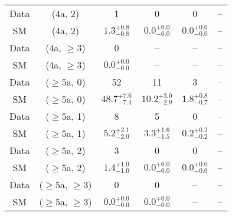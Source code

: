 \begin{table}[h!]
{\begin{tabular}{cccccc}
	Data & (4a, 2) & 1 & 0 & 0 & -- \\[0.5ex] 
	SM & (4a, 2) & $1.3^{+ 0.8 }_{- 0.8 }$ & $0.0^{+ 0.0 }_{- 0.0 }$ & $0.0^{+ 0.0 }_{- 0.0 }$ & -- \\[0.5ex] 
	Data & (4a, $\ge3$) & 0 & -- & -- & -- \\[0.5ex] 
	SM & (4a, $\ge3$) & $0.0^{+ 0.0 }_{- 0.0 }$ & -- & -- & -- \\[0.5ex] 
	Data & ($\ge5$a, 0) & 52 & 11 & 3 & -- \\[0.5ex] 
	SM & ($\ge5$a, 0) & $48.7^{+ 7.6 }_{- 7.4 }$ & $10.2^{+ 3.0 }_{- 2.9 }$ & $1.8^{+ 0.8 }_{- 0.7 }$ & -- \\[0.5ex] 
	Data & ($\ge5$a, 1) & 8 & 5 & 0 & -- \\[0.5ex] 
	SM & ($\ge5$a, 1) & $5.2^{+ 2.1 }_{- 2.0 }$ & $3.3^{+ 1.6 }_{- 1.5 }$ & $0.2^{+ 0.2 }_{- 0.2 }$ & -- \\[0.5ex] 
	Data & ($\ge5$a, 2) & 3 & 0 & 0 & -- \\[0.5ex] 
	SM & ($\ge5$a, 2) & $1.4^{+ 1.0 }_{- 1.0 }$ & $0.0^{+ 0.0 }_{- 0.0 }$ & $0.0^{+ 0.0 }_{- 0.0 }$ & -- \\[0.5ex] 
	Data & ($\ge5$a, $\ge3$) & 0 & 0 & -- & -- \\[0.5ex] 
	SM & ($\ge5$a, $\ge3$) & $0.0^{+ 0.0 }_{- 0.0 }$ & $0.0^{+ 0.0 }_{- 0.0 }$ & -- & -- \\[0.5ex] 
	\hline
	\hline
\end{tabular}}
\end{table}
